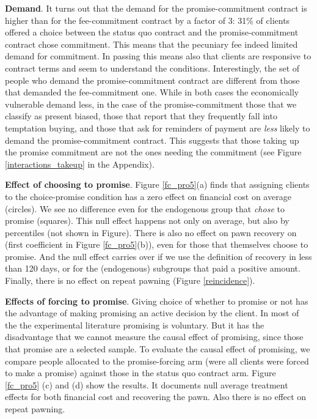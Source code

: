 \documentclass[oneside,11pt]{article}
\begin{document}
\vspace{.1in}
\noindent \textbf{Demand}. It turns out that the demand for the promise-commitment contract  is higher than for the fee-commitment contract by a factor of 3: {31}\% of clients offered a choice between the status quo contract and the promise-commitment contract chose commitment. This means that the pecuniary fee indeed limited demand for commitment. In passing this means also that clients are responsive to contract terms and seem to understand the conditions. Interestingly, the set of people who demand the promise-commitment contract are different from those that demanded the fee-commitment one. While in both cases the economically vulnerable demand less, in the case of the promise-commitment those that we classify as present biased, those that report that they frequently fall into temptation buying, and those that ask for reminders of payment are \textit{less} likely to demand the promise-commitment contract.  This suggests that those taking up the promise commitment are not the ones needing the commitment (see Figure \ref{interactions_takeup} in the Appendix). 

\vspace{.2in}
\noindent \textbf{Effect of choosing to promise}. Figure \ref{fc_pro5}(a) finds that assigning clients to the choice-promise condition has a zero effect on financial cost on average (circles). We see no difference even for the endogenous group that \textit{chose} to promise (squares). This null effect happens not only on average, but also by percentiles (not shown in Figure). There is also no effect on pawn recovery on (first coefficient in Figure \ref{fc_pro5}(b)), even for those that themselves choose to promise. And the null effect carries over if we use the definition of recovery in less than 120 days, or for the (endogenous) subgroups that paid a positive amount. Finally, there is no effect on repeat pawning (Figure \ref{reincidence}). 

\vspace{.2in}
\noindent \textbf{Effects of forcing to promise}. Giving choice of whether to promise or not has the advantage of making promising an active decision by the client. In most of the the experimental literature promising is voluntary. But it has the disadvantage that we cannot measure the causal effect of promising, since those that promise are a selected sample. To evaluate the causal effect of promising, we compare people allocated to the promise-forcing arm (were all clients were forced to make a promise) against those in the status quo contract arm. Figure \ref{fc_pro5} (c) and (d) show the results. It documents null average treatment effects for both financial cost and recovering the pawn. Also there is no effect on repeat pawning.
\end{document}
